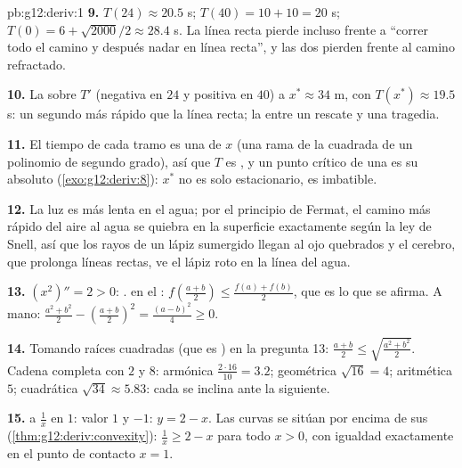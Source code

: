 \begin{solution}{pb:g12:deriv:1}
\textbf{9.} $T(24) \approx 20.5$ s; $T(40) = 10 + 10 = 20$ s;
$T(0) = 6 + \sqrt{2000}/2 \approx 28.4$ s. La línea recta pierde incluso
frente a ``correr todo el camino y después nadar en línea recta'', y las
dos pierden frente al camino refractado.

\textbf{10.} La  sobre $T'$ (negativa en $24$ y positiva en $40$)
 a $x^* \approx 34$ m, con $T(x^*) \approx 19.5$ s: un segundo más
rápido que la línea recta; la  entre un rescate y una tragedia.

\textbf{11.} El tiempo de cada tramo es una   de $x$ (una
rama de la  cuadrada de un polinomio de segundo grado), así que $T$ es
,
y un punto crítico de una    es su  absoluto
(\cref{exo:g12:deriv:8}): $x^*$ no es solo estacionario, es imbatible.

\textbf{12.} La luz es más lenta en el agua; por el principio de Fermat, el
camino más rápido del aire al agua se quiebra en la superficie exactamente
según la ley de Snell, así que los rayos de un lápiz sumergido llegan al
ojo quebrados y el cerebro, que prolonga líneas rectas, ve el lápiz roto en
la línea del agua.

\textbf{13.} $(x^2)'' = 2 > 0$: .  en el :
$f\left(\frac{a+b}{2}\right) \leq \frac{f(a) + f(b)}{2}$, que es lo que se
afirma. A mano:
$\frac{a^2 + b^2}{2} - \left(\frac{a+b}{2}\right)^2 =
\frac{(a - b)^2}{4} \geq 0$.

\textbf{14.} Tomando raíces cuadradas (que es ) en la pregunta 13:
$\frac{a + b}{2} \leq \sqrt{\frac{a^2 + b^2}{2}}$. Cadena completa con $2$
y $8$: armónica $\frac{2 \cdot 16}{10} = 3.2$; geométrica $\sqrt{16} = 4$;
aritmética $5$; cuadrática $\sqrt{34} \approx 5.83$: cada  se inclina
ante la siguiente.

\textbf{15.}  a $\frac1x$ en $1$: valor $1$ y  $-1$:
$y = 2 - x$. Las curvas  se sitúan por encima de sus 
(\cref{thm:g12:deriv:convexity}): $\frac1x \geq 2 - x$ para todo $x > 0$,
con igualdad exactamente en el punto de contacto $x = 1$.


\end{solution}
